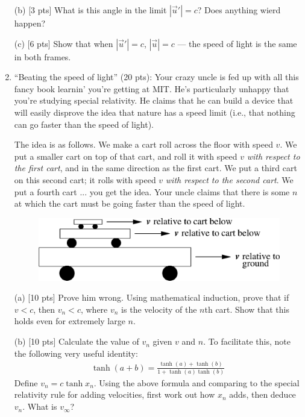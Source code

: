 \begin{enumerate}
\par\noindent (b) [3 pts] What is this angle in the limit $|\vec u'| =
c$?  Does anything wierd happen?

\par\noindent (c) [6 pts] Show that when $|\vec u'| = c$, $|\vec u| =
c$ --- the speed of light is the same in both frames.


\newpage

\item ``Beating the speed of light'' (20 pts): Your crazy uncle is fed
up with all this fancy book learnin' you're getting at MIT.  He's
particularly unhappy that you're studying special
relativity.  He claims
that he can build a device that will easily disprove the idea that
nature has a speed limit (i.e., that nothing can go faster than the
speed of light).

The idea is as follows.  We make a cart roll across the floor with
speed $v$.  We put a smaller cart on top of that cart, and roll it
with speed $v$ {\it with respect to the first cart}, and in the same
direction as the first cart.  We put a third cart on this second cart;
it rolls with speed $v$ {\it with respect to the second cart}.  We put
a fourth cart ... you get the idea.  Your uncle claims that there is
some $n$ at which the cart must be going faster than the speed of
light.

\begin{figure}[ht]
\begin{center}
\includegraphics[width = 12cm]{cart.eps}
\end{center}
\end{figure}

\par\noindent (a) [10 pts] Prove him wrong.  Using mathematical
induction, prove that if $v < c$, then $v_n < c$, where $v_n$ is the
velocity of the $n$th cart.  Show that this holds even for extremely
large $n$.

\par\noindent (b) [10 pts] Calculate the value of $v_n$ given $v$ and
$n$.  To facilitate this, note the following very useful identity:
\begin{eqnarray*}
\tanh(a + b) = \frac{\tanh(a) + \tanh(b)}{1 + \tanh(a)\tanh(b)}\;
\end{eqnarray*}
Define $v_n = c \tanh x_n$.  Using the above formula and comparing to
the special relativity rule for adding velocities, first work out how
$x_n$ adds, then deduce $v_n$.  What is $v_\infty$?


\end{enumerate}
